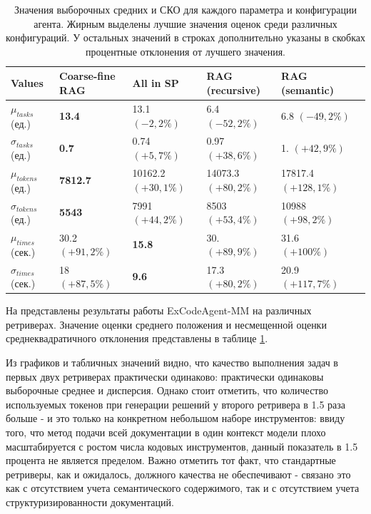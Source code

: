 \begin{table}[t!]%
	\centering\small
	\caption{Значения выборочных средних и СКО для каждого параметра и конфигурации агента. 
Жирным выделены лучшие значения оценок среди различных конфигураций. У остальных значений
в строках дополнительно указаны в скобках процентные отклонения от лучшего значения.}%
	\label{tab:ch4:values}		
	\begin{tabular}{|l|l|l|l|l|l|}
		\hline
		Values&Coarse-fine RAG&All in SP&RAG (recursive)&RAG (semantic)\\
		\hline
		$\mu_{tasks}$ (ед.)&\textbf{13.4}&13.1 $(-2,2\%)$&6.4 $(-52,2\%)$&6.8 $(-49,2\%)$\\ \hline
		$\sigma_{tasks}$ (ед.)&\textbf{0.7}&0.74 $(+5,7\%)$&0.97 $(+38,6\%)$&1. $(+42,9\%)$\\ \hline
		$\mu_{tokens}$ (ед.)&\textbf{7812.7}&10162.2 $(+30,1\%)$&14073.3 $(+80,2\%)$&17817.4 $(+128,1\%)$\\ \hline
		$\sigma_{tokens}$ (ед.)&\textbf{5543}&7991 $(+44,2\%)$&8503 $(+53,4\%)$&10988 $(+98,2\%)$\\ \hline
		$\mu_{times}$ (сек.)&30.2 $(+91,2\%)$&\textbf{15.8}&30. $(+89,9\%)$&31.6 $(+100\%)$\\ \hline
		$\sigma_{times}$ (сек.)&18 $(+87,5\%)$&\textbf{9.6}&17.3 $(+80,2\%)$&20.9 $(+117,7\%)$\\ \hline		
	\end{tabular}	
	\normalsize%
\end{table}


На  представлены результаты работы ExCodeAgent-MM на различных 
ретриверах. Значение оценки среднего положения и несмещенной оценки среднеквадратичного отклонения
представлены в таблице \ref{tab:ch4:values}.

Из графиков и табличных значений видно, что качество выполнения задач в первых двух ретриверах практически 
одинаково: практически одинаковы выборочные среднее и дисперсия. Однако стоит отметить, что количество 
используемых токенов при генерации решений у второго ретривера в 1.5 раза больше - и это только на конкретном
небольшом наборе инструментов: ввиду того, что метод подачи всей документации в один контекст модели плохо
масштабируется с ростом числа кодовых инструментов, данный показатель в 1.5 процента не является пределом.
Важно отметить тот факт, что стандартные ретриверы, как и ожидалось, должного качества не обеспечивают - связано
это как с отсутствием учета семантического содержимого, так и с отсутствием учета структуризированности 
документаций. 

